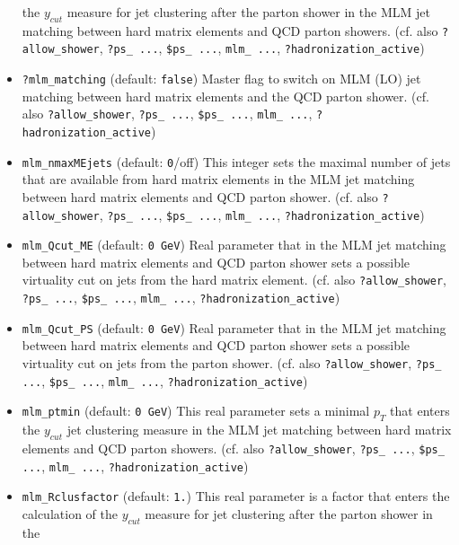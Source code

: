 \documentclass[12pt]{book}
\newcommand{\ttt}[1]{\texttt{#1}}
\begin{document}
\begin{itemize}
the $y_{cut}$ measure for jet clustering after the parton shower in the
MLM jet matching between hard matrix elements and QCD parton showers. 
(cf. also \ttt{?allow\_shower}, \ttt{?ps\_ ...}, \ttt{\$ps\_ ...},
\ttt{mlm\_ ...}, \ttt{?hadronization\_active})  
\item
\ttt{?mlm\_matching} \qquad (default: \ttt{false}) \newline
Master flag to switch on MLM (LO) jet matching between hard matrix
elements and the QCD parton shower. (cf. also
\ttt{?allow\_shower}, \ttt{?ps\_ ...}, \ttt{\$ps\_ ...}, \ttt{mlm\_
...}, \ttt{?hadronization\_active})  
\item
\ttt{mlm\_nmaxMEjets} \qquad (default: \ttt{0}/off) \newline
This integer sets the maximal number of jets that are available from
hard matrix elements in the MLM jet matching between hard matrix
elements and QCD parton shower. (cf. also
\ttt{?allow\_shower}, \ttt{?ps\_ ...}, \ttt{\$ps\_ ...}, \ttt{mlm\_
...}, \ttt{?hadronization\_active})
\item
\ttt{mlm\_Qcut\_ME} \qquad (default: \ttt{0 GeV}) \newline
Real parameter that in the MLM jet matching between hard matrix
elements and QCD parton shower sets a possible virtuality cut on jets
from the hard matrix element. (cf. also
\ttt{?allow\_shower}, \ttt{?ps\_ ...}, \ttt{\$ps\_ ...}, \ttt{mlm\_
...}, \ttt{?hadronization\_active}) 
\item
\ttt{mlm\_Qcut\_PS} \qquad (default: \ttt{0 GeV}) \newline
Real parameter that in the MLM jet matching between hard matrix
elements and QCD parton shower sets a possible virtuality cut on jets
from the parton shower. (cf. also
\ttt{?allow\_shower}, \ttt{?ps\_ ...}, \ttt{\$ps\_ ...}, \ttt{mlm\_
...}, \ttt{?hadronization\_active}) 
\item
\ttt{mlm\_ptmin} \qquad (default: \ttt{0 GeV}) \newline
This real parameter sets a minimal $p_T$ that enters the $y_{cut}$ jet
clustering measure in the MLM jet matching between hard matrix
elements and QCD parton showers.  (cf. also
\ttt{?allow\_shower}, \ttt{?ps\_ ...}, \ttt{\$ps\_ ...}, \ttt{mlm\_
...}, \ttt{?hadronization\_active}) 
\item
\ttt{mlm\_Rclusfactor} \qquad (default: \ttt{1.}) \newline
This real parameter is a factor that enters the calculation of the
$y_{cut}$ measure for jet clustering after the parton shower in the

\end{itemize}
\end{document}
